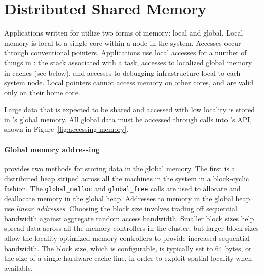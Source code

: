 \section{Distributed Shared Memory}

Applications written for \Grappa utilize two forms of memory: local and
global. Local memory is local to a single core within a node in the system.
Accesses occur through conventional pointers. Applications use local accesses for a
number of things in \Grappa: the stack associated with a task, accesses to
localized global memory in caches (see below), and accesses to debugging
infrastructure local to each system node. Local pointers cannot access
memory on other cores, and are valid only on their home core.

Large data that is expected to be shared and accessed with low locality is
stored in \Grappa's global memory. All global data must be accessed through
calls into \Grappa's API, shown in Figure~\ref{fig:accessing-memory}. 


\paragraph{Global memory addressing} \Grappa provides two methods for storing
data in the global memory. The first is a distributed heap striped across all
the machines in the system in a block-cyclic fashion. The
\texttt{global\_malloc} and \texttt{global\_free} calls are used to allocate
and deallocate memory in the global heap. Addresses to memory in the global
heap use \emph{linear addresses}. Choosing the block size involves trading off
sequential bandwidth against aggregate random access bandwidth. Smaller block
sizes help spread data across all the memory controllers in the cluster, but
larger block sizes allow the locality-optimized memory controllers to provide
increased sequential bandwidth. The block size, which is configurable, is
typically set to 64 bytes, or the size of a single hardware cache line, in
order to exploit spatial locality when available.

